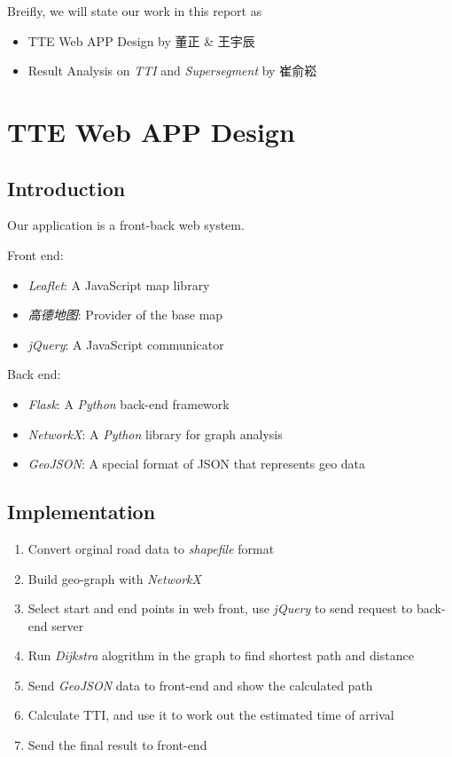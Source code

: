 \documentclass[fontset=none]{ctexart}
\theoremstyle{definition}
\theoremstyle{remark}
\begin{document}
Breifly, we will state our work in this report as
\begin{itemize}
  \item TTE Web APP Design by 董正 \& 王宇辰
  \item Result Analysis on \textit{TTI} and \textit{Supersegment} by 崔俞崧
\end{itemize}

\section{TTE Web APP Design}
\subsection{Introduction}
Our application is a front-back web system.

Front end:
\begin{itemize}
  \item \textit{Leaflet}: A JavaScript map library
  \item \textit{高德地图}: Provider of the base map
  \item \textit{jQuery}: A JavaScript communicator
\end{itemize}

Back end:
\begin{itemize}
  \item \textit{Flask}: A \textit{Python} back-end framework
  \item \textit{NetworkX}: A \textit{Python} library for graph analysis
  \item \textit{GeoJSON}: A special format of JSON that represents geo data
\end{itemize}

\subsection{Implementation}
\begin{enumerate}
  \item Convert orginal road data to \textit{shapefile} format
  \item Build geo-graph with \textit{NetworkX}
  \item Select start and end points in web front, use \textit{jQuery} to send request to back-end server
  \item Run \textit{Dijkstra} alogrithm in the graph to find shortest path and distance
  \item Send \textit{GeoJSON} data to front-end and show the calculated path
  \item Calculate TTI, and use it to work out the estimated time of arrival
  \item Send the final result to front-end
\end{enumerate}
\end{document}
